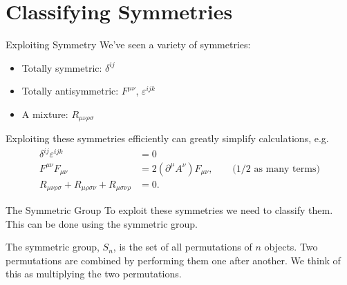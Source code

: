 \documentclass{beamer}
\newcommand{\define}[1]{\alert{#1}}
\begin{document}
    \section{Classifying Symmetries}
    
    \begin{frame}{Exploiting Symmetry}
        We've seen a variety of symmetries:
        \begin{itemize}
            \item Totally symmetric: \(\delta^{ij}\)
            \item Totally antisymmetric: \(F^{\mu\nu}\), \(\varepsilon^{ijk}\)
            \item A mixture: \(R_{\mu\nu\rho\sigma}\)
        \end{itemize}
        \pause
        Exploiting these symmetries efficiently can greatly simplify calculations, e.g.
        \begin{align*}
            \delta^{ij}\varepsilon^{ijk} &= 0\\
            F^{\mu\nu}F_{\mu\nu} &= 2(\partial^\mu A^\nu)F_{\mu\nu}, \qquad \text{(1/2 as many terms)}\\
            R_{\mu\nu\rho\sigma} + R_{\mu\rho\sigma\nu} + R_{\mu\sigma\nu\rho} &= 0.
        \end{align*}
    \end{frame}
    
    \begin{frame}{The Symmetric Group}
        To exploit these symmetries we need to classify them.
        This can be done using the \define{symmetric group}.
        
        \pause
        \begin{definition}
            The \define{symmetric group}, \(S_n\), is the set of all permutations of \(n\) objects.
            Two permutations are combined by performing them one after another.
            We think of this as multiplying the two permutations.
        \end{definition}
    \end{frame}
    
\end{document}
